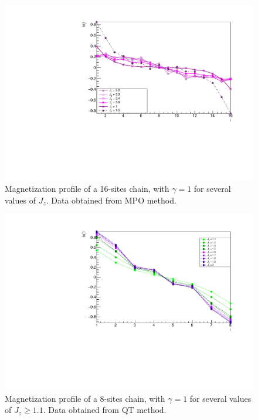 \begin{figure}[H]
    \centering
    \includegraphics[scale=0.7]{Figures/16sites/16sites_LMvsLOWJz.pdf}
    \caption{Magnetization profile of a 16-sites chain, with $\gamma = 1$ for several values of $J_z$. Data obtained from MPO method.}
    \label{fig:16sites_LMvsLOWJz}
\end{figure}

\begin{figure}[H]
    \centering
    \includegraphics[scale=0.7]{Figures/8sites/8sites_LMvsJz_gtOneQT.pdf}
    \caption{Magnetization profile of a 8-sites chain, with $\gamma = 1$ for several values of $J_z \geq 1.1$. Data obtained from QT method.}
    \label{fig:8sites_LMvsJz_gtOneQT}
\end{figure}